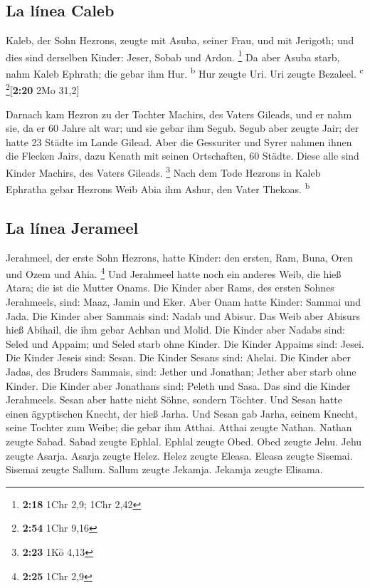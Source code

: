 \hypertarget{la-luxednea-caleb}{%
\subsection{La línea Caleb}\label{la-luxednea-caleb}}

 Kaleb, der Sohn Hezrons, zeugte mit Asuba, seiner Frau,
und mit Jerigoth; und dies sind derselben Kinder: Jeser, Sobab und
Ardon. \footnote{\textbf{2:18} 1Chr 2,9; 1Chr 2,42}  Da
aber Asuba starb, nahm Kaleb Ephrath; die gebar ihm Hur.
\textsuperscript{b}  Hur zeugte Uri. Uri zeugte Bezaleel.
\textsuperscript{c} \footnote{\textbf{2:54} 1Chr 9,16}{[}\textbf{2:20}
2Mo 31,2{]}

 Darnach kam Hezron zu der Tochter Machirs, des Vaters
Gileads, und er nahm sie, da er 60 Jahre alt war; und sie gebar ihm
Segub.  Segub aber zeugte Jair; der hatte 23 Städte im
Lande Gilead.  Aber die Gessuriter und Syrer nahmen ihnen
die Flecken Jairs, dazu Kenath mit seinen Ortschaften, 60 Städte. Diese
alle sind Kinder Machirs, des Vaters Gileads. \footnote{\textbf{2:23}
  1Kö 4,13}  Nach dem Tode Hezrons in Kaleb Ephratha
gebar Hezrons Weib Abia ihm Ashur, den Vater Thekoas.
\textsuperscript{b}

\hypertarget{la-luxednea-jerameel}{%
\subsection{La línea Jerameel}\label{la-luxednea-jerameel}}

 Jerahmeel, der erste Sohn Hezrons, hatte Kinder: den
ersten, Ram, Buna, Oren und Ozem und Ahia. \footnote{\textbf{2:25} 1Chr
  2,9}  Und Jerahmeel hatte noch ein anderes Weib, die
hieß Atara; die ist die Mutter Onams.  Die Kinder aber
Rams, des ersten Sohnes Jerahmeels, sind: Maaz, Jamin und Eker.
 Aber Onam hatte Kinder: Sammai und Jada. Die Kinder aber
Sammais sind: Nadab und Abisur.  Das Weib aber Abisurs
hieß Abihail, die ihm gebar Achban und Molid.  Die Kinder
aber Nadabs sind: Seled und Appaim; und Seled starb ohne Kinder.
 Die Kinder Appaims sind: Jesei. Die Kinder Jeseis sind:
Sesan. Die Kinder Sesans sind: Ahelai.  Die Kinder aber
Jadas, des Bruders Sammais, sind: Jether und Jonathan; Jether aber starb
ohne Kinder.  Die Kinder aber Jonathans sind: Peleth und
Sasa. Das sind die Kinder Jerahmeels.  Sesan aber hatte
nicht Söhne, sondern Töchter. Und Sesan hatte einen ägyptischen Knecht,
der hieß Jarha.  Und Sesan gab Jarha, seinem Knecht,
seine Tochter zum Weibe; die gebar ihm Atthai.  Atthai
zeugte Nathan. Nathan zeugte Sabad.  Sabad zeugte Ephlal.
Ephlal zeugte Obed.  Obed zeugte Jehu. Jehu zeugte
Asarja.  Asarja zeugte Helez. Helez zeugte Eleasa.
 Eleasa zeugte Sisemai. Sisemai zeugte Sallum.
 Sallum zeugte Jekamja. Jekamja zeugte Elisama.

